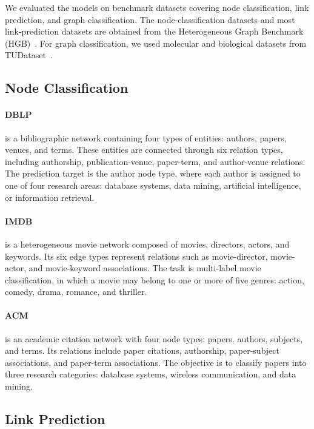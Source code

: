 We evaluated the models on benchmark datasets covering node classification,
link prediction, and graph classification. The node-classification datasets and
most link-prediction datasets are obtained from the Heterogeneous Graph
Benchmark (HGB)~\cite{lv2021hgb}. For graph classification, we used molecular
and biological datasets from TUDataset~\cite{morris2020tudataset}. 

\subsection{Node Classification}

\paragraph{DBLP}
is a bibliographic network containing four types of entities: authors,
papers, venues, and terms. These entities are connected through six relation
types, including authorship, publication-venue, paper-term, and author-venue
relations. The prediction target is the author node type, where each author is
assigned to one of four research areas: database systems, data mining,
artificial intelligence, or information retrieval.

\paragraph{IMDB}
is a heterogeneous movie network composed of movies, directors, actors,
and keywords. Its six edge types represent relations such as movie-director,
movie-actor, and movie-keyword associations. The task is multi-label movie
classification, in which a movie may belong to one or more of five genres:
action, comedy, drama, romance, and thriller.

\paragraph{ACM}
is an academic citation network with four node types: papers, authors,
subjects, and terms. Its relations include paper citations, authorship,
paper-subject associations, and paper-term associations. The objective is to
classify papers into three research categories: database systems, wireless
communication, and data mining.

\subsection{Link Prediction}

